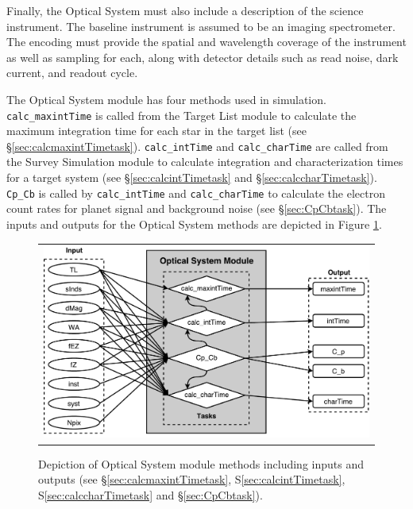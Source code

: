 \documentclass[cleanfoot]{asme2ej}
\newcommand{\reffig}[1]{Figure \ref{#1}}
\begin{document}
Finally, the Optical System must also include a description of the science instrument.  The baseline instrument is assumed to be an imaging spectrometer.  The encoding must provide the spatial and wavelength coverage of the instrument as well as sampling for each, along with detector details such as read noise, dark current, and readout cycle.

The Optical System module has four methods used in simulation.  \verb+calc_maxintTime+ is called from the Target List module to calculate the maximum integration time for each star in the target list (see \S\ref{sec:calcmaxintTimetask}).  \verb+calc_intTime+ and \verb+calc_charTime+ are called from the Survey Simulation module to calculate integration and characterization times for a target system (see \S\ref{sec:calcintTimetask} and \S\ref{sec:calccharTimetask}). \verb+Cp_Cb+ is called by \verb+calc_intTime+ and \verb+calc_charTime+ to calculate the electron count rates for planet signal and background noise (see \S\ref{sec:CpCbtask}).
The inputs and outputs for the Optical System methods are depicted in \reffig{fig:opticalsysmodule}.

\begin{figure}[ht]
    \begin{center}
        \begin{tabular}{c}
            \includegraphics[width=\textwidth]{OpticalSysTasks2}
        \end{tabular}
    \end{center}
    \caption{\label{fig:opticalsysmodule} Depiction of Optical System module methods including inputs and outputs (see \S\ref{sec:calcmaxintTimetask}, S\ref{sec:calcintTimetask}, S\ref{sec:calccharTimetask} and \S\ref{sec:CpCbtask}).}
\end{figure}
\end{document}
